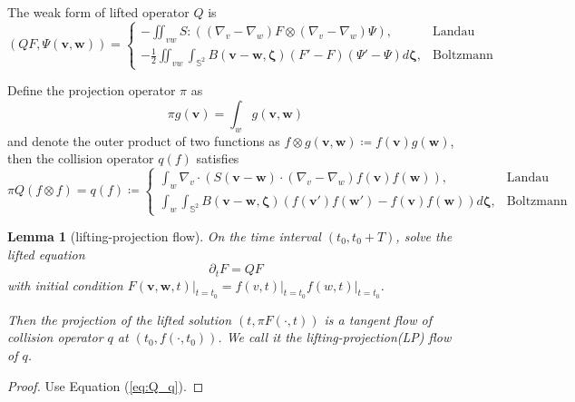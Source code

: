 \documentclass{article}
\newtheorem{lemma}{Lemma}
\numberwithin{equation}{section}
\begin{document}
The weak form of lifted operator $Q$ is
\begin{equation*}
    \left(QF, \Psi(\mathbf{v},\mathbf{w})\right) = \begin{cases}
        -\iint_{vw} S:((\nabla_v-\nabla_w)F\otimes(\nabla_v-\nabla_w)\Psi),&\text{Landau}\\[10pt]
       -\frac{1}{2}\iint_{vw}\int_{\mathbb{S}^{2}} B(\mathbf{v}-\mathbf{w},\mathbf{\zeta}) (F'-F)\left(\Psi' - \Psi \right)d\mathbf{\zeta},&\text{Boltzmann}
    \end{cases}
\end{equation*}

Define the projection operator $\pi$ as
\begin{equation*}
    \pi g(\mathbf{v}) =\int_{w} g(\mathbf{v}, \mathbf{w})
\end{equation*}
and denote the outer product of two functions as $f\otimes g (\mathbf{v}, \mathbf{w})\coloneqq f(\mathbf{v})g(\mathbf{w})$, then the collision operator $q(f)$ satisfies
\begin{equation}\label{eq:Q_q}
   \pi Q(f\otimes f) = q(f) \coloneqq  \begin{cases}
        \int_{w}  \nabla_{v} \cdot \left(S(\mathbf{v}-\mathbf{w}) \cdot (\nabla_{v} - \nabla_{w})f(\mathbf{v})f(\mathbf{w})\right),&\text{Landau}\\[10pt]
        \int_{w} \int_{\mathbb{S}^{2}} B(\mathbf{v}-\mathbf{w},\mathbf{\zeta}) \left(f(\mathbf{v}')f(\mathbf{w}') - f(\mathbf{v})f(\mathbf{w})\right)d\mathbf{\zeta},&\text{Boltzmann}
    \end{cases}
\end{equation}


\bigskip

\begin{lemma}[lifting-projection flow]
On the time interval $(t_{0}, t_{0}+T)$, solve the lifted equation
\begin{equation}\label{eq:2-kac}
    \partial_{t} F = Q F
\end{equation}
with initial condition $\left.F(\mathbf{v},\mathbf{w},t)\right|_{t=t_{0}} =\left.f(v,t)\right|_{t=t_{0}}\left.f(w,t)\right|_{t=t_{0}}$.

Then the projection of the lifted solution $(t, \pi F (\cdot, t))$ is a tangent flow of collision operator $q$ at $(t_{0}, f(\cdot, t_{0}))$. We call it the lifting-projection(LP) flow of $q$.
\end{lemma}
\begin{proof}
    Use Equation (\ref{eq:Q_q}).
\end{proof}
\end{document}
